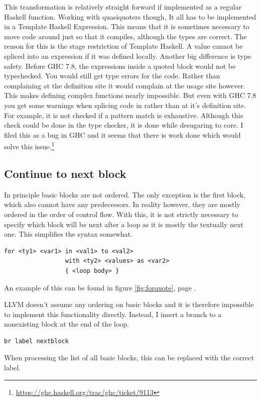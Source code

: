 \documentclass[a4paper,bibliography=totocnumbered,parskip,headsepline]{scrbook}
\begin{document}
This transformation is relatively straight forward if implemented as a regular Haskell function.
Working with quasiquoters though, It all has to be implemented in a Template Haskell Expression.
This means that it is sometimes necessary to move code around just so that it compiles, although the types are correct.
The reason for this is the stage restriction of Template Haskell.
A value cannot be spliced into an expression if it was defined locally.
Another big difference is type safety.
Before GHC 7.8, the expressions inside a quoted block would not be typechecked.
You would still get type errors for the code.
Rather than complaining at the definition site it would complain at the usage site however.
This makes defining complex functions nearly impossible.
But even with GHC 7.8 you get some warnings when splicing code in rather than at it's definition site.
For example, it is not checked if a pattern match is exhaustive.
Although this check could be done in the type checker, it is done while desugaring to core.
I filed this as a bug in GHC and it seems that there is work done which would solve this issue.\footnote{\url{https://ghc.haskell.org/trac/ghc/ticket/9113}}

\subsection{Continue to next block}
In principle basic blocks are not ordered.
The only exception is the first block, which also cannot have any predecessors.
In reality however, they are mostly ordered in the order of control flow.
With this, it is not strictly necessary to specify which block will be next after a loop as it is mostly the textually next one.
This simplifies the syntax somewhat.

\begin{lstlisting}[numbers=none]
for <ty1> <var1> in <val1> to <val2>
                 with <ty2> <values> as <var2>
                 { <loop body> }
\end{lstlisting}

An example of this can be found in figure \ref{fig:forquote}, page \pageref{fig:forquote}.

LLVM doesn't assume any ordering on basic blocks and it is therefore impossible to implement this functionality directly.
Instead, I insert a branch to a nonexisting block at the end of the loop.
\begin{lstlisting}
br label nextblock
\end{lstlisting}
When processing the list of all basic blocks, this can be replaced with the correct label.
\end{document}
